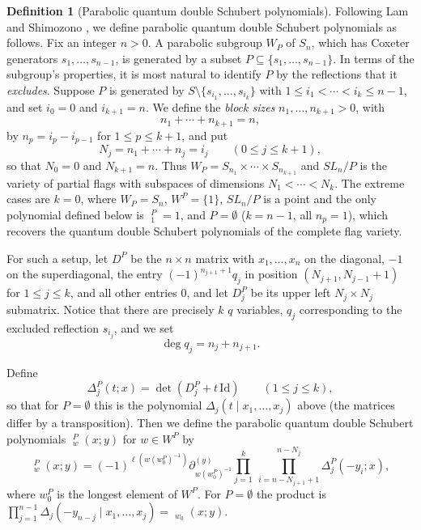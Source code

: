 \documentclass{amsart}
\theoremstyle{definition}
\newtheorem{definition}[lemma]{Definition}
\theoremstyle{remark}
\numberwithin{equation}{section}
\DeclareMathOperator{\qsch}{\widetilde{\mathfrak{S}}}
\begin{document}
\begin{definition}[Parabolic quantum double Schubert polynomials] \label{def:parabolic}
	Following Lam and Shimozono \cite{lam2014quantum}, we define parabolic quantum double Schubert polynomials as follows. Fix an integer $n>0$. A parabolic subgroup $W_P$ of $S_{n}$, which has Coxeter generators $s_1,\ldots,s_{n-1}$, is generated by a subset $P\subseteq \{s_1,\ldots,s_{n-1}\}$. In terms of the subgroup's properties, it is most natural to identify $P$ by the reflections that it \emph{excludes}. Suppose $P$ is generated by $S\setminus \{s_{i_1},\ldots,s_{i_k}\}$ with $1\leq i_1<\cdots<i_k\leq n-1$, and set $i_0=0$ and $i_{k+1}=n$. We define the \emph{block sizes} $n_1,\ldots,n_{k+1}>0$, with
	$$n_1+\cdots+n_{k+1}=n,$$
	by $n_p = i_{p} - i_{p-1}$ for $1\leq p\leq k+1$, and put
	$$N_j = n_1+\cdots+n_j=i_j\qquad(0\leq j\leq k+1),$$
	so that $N_0=0$ and $N_{k+1}=n$. Thus $W_P=S_{n_1}\times\cdots\times S_{n_{k+1}}$ and $SL_n/P$ is the variety of partial flags with subspaces of dimensions $N_1<\cdots<N_k$. The extreme cases are $k=0$, where $W_P=S_n$, $W^P=\{1\}$, $SL_n/P$ is a point and the only polynomial defined below is $\qsch^P_1=1$, and $P=\emptyset$ ($k=n-1$, all $n_p=1$), which recovers the quantum double Schubert polynomials of the complete flag variety.
	
	For such a setup, let $D^P$ be the $n\times n$ matrix with $x_1,\ldots,x_n$ on the diagonal, $-1$ on the superdiagonal, the entry $(-1)^{n_{j+1}+1}q_j$ in position $(N_{j+1},N_{j-1}+1)$ for $1\leq j\leq k$, and all other entries $0$, and let $D^P_j$ be its upper left $N_j\times N_j$ submatrix. Notice that there are precisely $k$ $q$ variables, $q_j$ corresponding to the excluded reflection $s_{i_j}$, and we set
	$$\deg q_j = n_j + n_{j+1}.$$  
	
	Define 
	$$\Delta^P_j(t;x)=\det(D^P_j+t\,\mathrm{Id})\qquad(1\leq j\leq k),$$
	so that for $P=\emptyset$ this is the polynomial $\Delta_j(t\mid x_1,\ldots,x_j)$ above (the matrices differ by a transposition). Then we define the parabolic quantum double Schubert polynomials $\qsch_w^P(x;y)$ for $w\in W^P$ by
	$$\qsch^P_w(x;y)=(-1)^{\ell(w(w_0^P)^{-1})}\partial_{w(w_0^P)^{-1}}^{(y)}\prod_{j=1}^k\ \prod_{i=n-N_{j+1}+1}^{n-N_j} \Delta^P_j(-y_i;x),$$
	where $w_0^P$ is the longest element of $W^P$. For $P=\emptyset$ the product is $\prod_{j=1}^{n-1}\Delta_j(-y_{n-j}\mid x_1,\ldots,x_j)=\qsch_{w_0}(x;y)$.
	

\end{definition}
\end{document}
